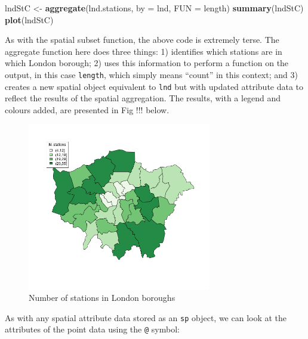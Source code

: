 \documentclass[]{article}
\newenvironment{Shaded}{}{}
\newcommand{\KeywordTok}[1]{\textcolor[rgb]{0.00,0.44,0.13}{\textbf{{#1}}}}
\newcommand{\DataTypeTok}[1]{\textcolor[rgb]{0.56,0.13,0.00}{{#1}}}
\newcommand{\NormalTok}[1]{{#1}}
\let\Oldincludegraphics\includegraphics
\renewcommand{\includegraphics}[1]{\Oldincludegraphics[width=8cm]{#1}}
\begin{document}
\begin{Shaded}
\begin{Highlighting}[]
\NormalTok{lndStC <- }\KeywordTok{aggregate}\NormalTok{(lnd.stations, }\DataTypeTok{by =} \NormalTok{lnd, }\DataTypeTok{FUN =} \NormalTok{length)}
\KeywordTok{summary}\NormalTok{(lndStC)}
\KeywordTok{plot}\NormalTok{(lndStC)}
\end{Highlighting}
\end{Shaded}
As with the spatial subset function, the above code is extremely terse.
The aggregate function here does three things: 1) identifies which
stations are in which London borough; 2) uses this information to
perform a function on the output, in this case \texttt{length}, which
simply means ``count'' in this context; and 3) creates a new spatial
object equivalent to \texttt{lnd} but with updated attribute data to
reflect the results of the spatial aggregation. The results, with a
legend and colours added, are presented in Fig !!! below.

\begin{figure}[htbp]
\centering
\includegraphics{figure/nStations.png}
\caption{Number of stations in London boroughs}
\end{figure}

As with any spatial attribute data stored as an \texttt{sp} object, we
can look at the attributes of the point data using the \texttt{@}
symbol:
\end{document}
